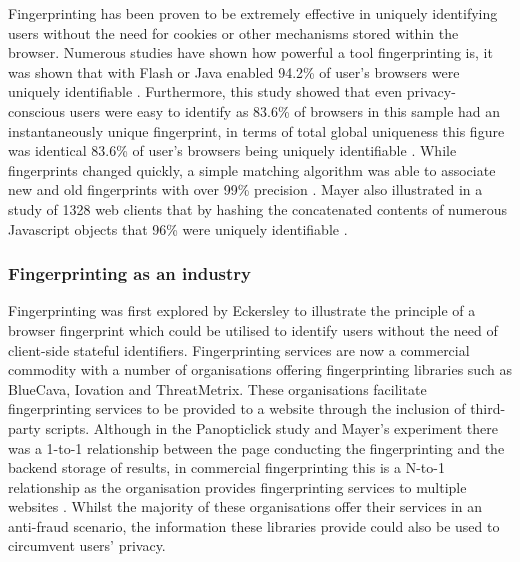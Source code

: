 \documentclass[12pt]{article}
\begin{document}
Fingerprinting has been proven to be extremely effective in uniquely identifying users without the need for cookies or other mechanisms stored within the browser. Numerous studies have shown how powerful a tool fingerprinting is, it was shown that with Flash or Java enabled 94.2\% of user's browsers were uniquely identifiable \parencite{uniqueBrowser}. Furthermore, this study showed that even privacy-conscious users were easy to identify as 83.6\% of browsers in this sample had an instantaneously unique fingerprint, in terms of total global uniqueness this figure was identical 83.6\% of user's browsers being uniquely identifiable \parencite{uniqueBrowser}. While fingerprints changed quickly, a simple matching algorithm was able to associate new and old fingerprints with over 99\% precision \parencite{uniqueBrowser}. Mayer also illustrated in a study of 1328 web clients that by hashing the concatenated contents of numerous Javascript objects that 96\% were uniquely identifiable \parencite{mayer09}.

\subsubsection{Fingerprinting as an industry}
Fingerprinting was first explored by Eckersley \parencite{uniqueBrowser} to illustrate the principle of a browser fingerprint which could be utilised to identify users without the need of client-side stateful identifiers. Fingerprinting services are now a commercial commodity with a number of organisations offering fingerprinting libraries such as BlueCava, Iovation and ThreatMetrix. These organisations facilitate fingerprinting services to be provided to a website through the inclusion of third-party scripts. Although in the Panopticlick study \parencite{uniqueBrowser} and Mayer's experiment \parencite{mayer09} there was a 1-to-1 relationship between the page conducting the fingerprinting and the backend storage of results, in commercial fingerprinting this is a N-to-1 relationship as the organisation provides fingerprinting services to multiple websites \parencite{cookielessMonster}. Whilst the majority of these organisations offer their services in an anti-fraud scenario, the information these libraries provide could also be used to circumvent users' privacy.

\end{document}
